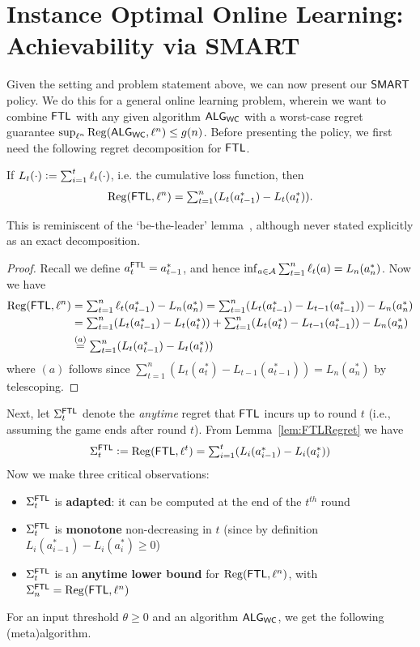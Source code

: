 \section{Instance Optimal Online Learning: Achievability via SMART} \label{sec:twoapprox}

Given the setting and problem statement above, we can now present our $\mathsf{SMART}$ policy. 
We do this for a general online learning problem, wherein we want to combine $\mathsf{FTL}$ with any given algorithm $\mathsf{ALG}_{\mathsf{WC}}$ with a worst-case regret guarantee $
\sup_{\ell^n} \mathrm{Reg}(\mathsf{ALG}_{\mathsf{WC}}, \ell^n) \le g(n)
$. 
Before presenting the policy, we first need the following regret decomposition for $\mathsf{FTL}$. 
\begin{lemma} \label{lem:FTLRegret}
If $L_t(\cdot) \mathrel{\mathop{:}}= \sum_{i=1}^t \ell_t(\cdot)$, i.e. the cumulative loss function, then
\begin{align*} 
    \mathrm{Reg}(\mathsf{FTL}, \ell^n) = \textstyle\sum_{t=1}^n (L_t(a^*_{t-1}) - L_t(a^*_t)). 
\end{align*}
\end{lemma}
This is reminiscent of the `be-the-leader' lemma~\citep{kalai2005efficient,slivkins2019introduction}, although never stated explicitly as an exact decomposition. 
\begin{proof}
Recall we define $a^{\mathsf{FTL}}_t = a^*_{t-1}$, and hence $\inf_{a \in \mathcal{A}} \sum_{t=1}^n \ell_t(a)= L_n(a^*_n) $. Now we have 
    \begin{align*}
        \mathrm{Reg}(\mathsf{FTL}, \ell^n) 
        &= \textstyle\sum_{t=1}^n \ell_t(a^*_{t-1})  - L_n(a^*_n) 
        = \textstyle\sum_{t=1}^n (L_t(a^*_{t-1}) - L_{t-1}(a^*_{t-1})) -  L_n(a^*_n) \\
        &= \textstyle\sum_{t=1}^n (L_t(a^*_{t-1}) - L_t(a^*_t)) + \textstyle\sum_{t=1}^n (L_t(a^*_t) - L_{t-1}(a^*_{t-1})) - L_n(a^*_n) \\
        &\stackrel{(a)}{=} \textstyle\sum_{t=1}^n (L_t(a^*_{t-1}) - L_t(a^*_t))
    \end{align*}
    where $(a)$ follows since $\sum_{t=1}^n (L_t(a^*_t) - L_{t-1}(a^*_{t-1})) = L_n(a^*_n)$ by telescoping. 
\end{proof}
Next, let $\Sigma^{\mathsf{FTL}}_t$ denote the \emph{anytime} regret that $\mathsf{FTL}$ incurs up to round $t$ (i.e., assuming the game ends after round $t$). From Lemma~\ref{lem:FTLRegret} we have
\begin{align} 
\label{eq:FTLRegEquality}
 \Sigma^{\mathsf{FTL}}_t \mathrel{\mathop{:}}= \mathrm{Reg}(\mathsf{FTL}, \ell^t) = \textstyle\sum_{i=1}^t (L_i(a^*_{i-1}) - L_i(a^*_i)) 
\end{align}
Now we make three critical observations: 
\begin{itemize}[nosep]
    \item $\Sigma^{\mathsf{FTL}}_t$ is \textbf{adapted}: it can be computed at the end of the $t^{th}$ round %
    \item $\Sigma^{\mathsf{FTL}}_t$ is \textbf{monotone} non-decreasing in $t$ (since by definition $L_i(a^*_{i-1}) - L_i(a^*_i) \ge 0$)
    \item $\Sigma^{\mathsf{FTL}}_t$ is an \textbf{anytime lower bound} for $\mathrm{Reg}(\mathsf{FTL},\ell^n)$, with $\Sigma^{\mathsf{FTL}}_n = \mathrm{Reg}(\mathsf{FTL}, \ell^n)$
\end{itemize}
For an input threshold $\theta \ge 0$ and an algorithm $\mathsf{ALG}_{\mathsf{WC}}$, we get the following (meta)algorithm.

